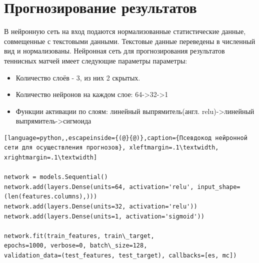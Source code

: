 \section{Прогнозирование результатов}
В нейронную сеть на вход подаются нормализованные статистические данные, совмещенные с текстовыми данными. Текстовые данные переведены в численный вид и нормализованы.
Нейронная сеть для прогнозирования результатов теннисных матчей имеет следующие параметры параметры:
\begin{itemize}
	\item Количество слоёв - 3, из них 2 скрытых.
	\item Количество нейронов на каждом слое: 64->32->1
	\item Функции активации по слоям:
	 линейный выпрямитель(англ. relu)->линейный выпрямитель->сигмоида
\end{itemize}
\begin{lstlisting}[language=python,,escapeinside={(@}{@)},caption={Псевдокод нейронной сети для осуществления прогнозов}, xleftmargin=.1\textwidth, xrightmargin=.1\textwidth] 

network = models.Sequential()
network.add(layers.Dense(units=64, activation='relu', input_shape=(len(features.columns),)))
network.add(layers.Dense(units=32, activation='relu'))
network.add(layers.Dense(units=1, activation='sigmoid'))

network.fit(train_features, train\_target, 
epochs=1000, verbose=0, batch\_size=128, 
validation_data=(test_features, test_target), callbacks=[es, mc]) 

\end{lstlisting}